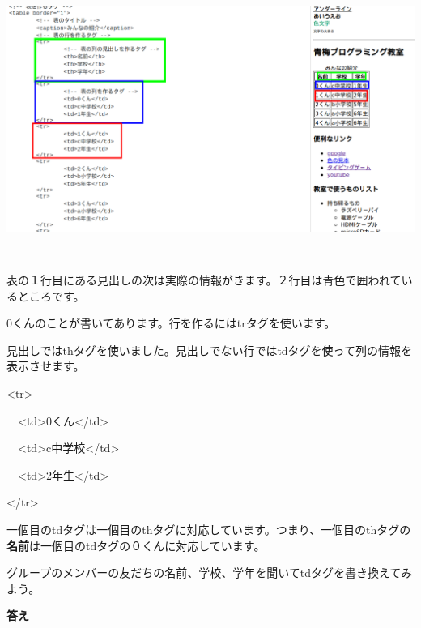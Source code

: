 \documentclass[a4paper,12pt]{jarticle}
\begin{document}
\centering
\includegraphics[width=16.388cm,height=9.036cm]{textbook-img191.png}

\flushleft

\bigskip

表の１行目にある見出しの次は実際の情報がきます。２行目は青色で囲われているところです。

0くんのことが書いてあります。行を作るにはtrタグを使います。

見出しではthタグを使いました。見出しでない行ではtdタグを使って列の情報を表示させます。

{\textless}tr{\textgreater}

\ \ {\textless}td{\textgreater}0くん{\textless}/td{\textgreater}

\ \ {\textless}td{\textgreater}c中学校{\textless}/td{\textgreater}

\ \ {\textless}td{\textgreater}2年生{\textless}/td{\textgreater}

{\textless}/tr{\textgreater}

一個目のtdタグは一個目のthタグに対応しています。つまり、一個目のthタグの\textbf{名前}は一個目のtdタグの０くんに対応しています。


\bigskip


\bigskip

グループのメンバーの友だちの名前、学校、学年を聞いてtdタグを書き換えてみよう。


\bigskip


\bigskip



\bigskip

\clearpage
\textbf{答え}




\bigskip
\end{document}
